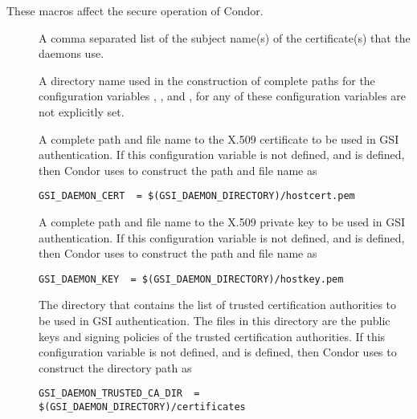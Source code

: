 These macros affect the secure operation of Condor.
\begin{description}

\item[]
\label{param:GSIDaemonName} A comma separated list of the subject
name(s) of the certificate(s) that the daemons use.

\item[]
\label{param:GSIDaemonDirectory} A directory name used in the
construction of complete paths for the configuration variables
,
, and
,
for any of these configuration variables are not explicitly set.

\item[]
\label{param:GSIDaemonCert} A complete path and file name to the
X.509 certificate to be used in GSI authentication.
If this configuration variable is not defined, and
 is defined, then Condor uses
 to construct the path and file name as
\begin{verbatim}
GSI_DAEMON_CERT  = $(GSI_DAEMON_DIRECTORY)/hostcert.pem
\end{verbatim}

\item[]
\label{param:GSIDaemonKey}  A complete path and file name to the
X.509 private key to be used in GSI authentication.
If this configuration variable is not defined, and
 is defined, then Condor uses
 to construct the path and file name as
\begin{verbatim}
GSI_DAEMON_KEY  = $(GSI_DAEMON_DIRECTORY)/hostkey.pem
\end{verbatim}

\item[]
\label{param:GSIDaemonTrustedCADir} The directory that contains the
list of trusted certification authorities to be used in GSI authentication.
The files in this directory are the public keys and signing policies
of the trusted certification authorities.
If this configuration variable is not defined, and
 is defined, then Condor uses
 to construct the directory path as
\begin{verbatim}
GSI_DAEMON_TRUSTED_CA_DIR  = $(GSI_DAEMON_DIRECTORY)/certificates
\end{verbatim}


\end{description}
